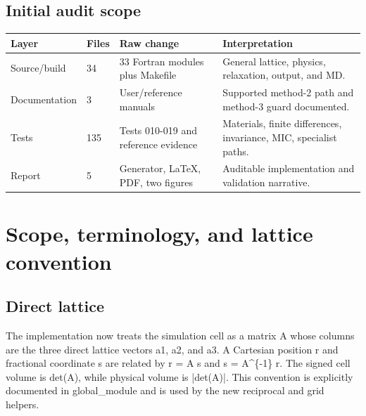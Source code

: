 \documentclass[10pt,a4paper]{report}
\begin{document}
\section{Initial audit scope}
\small\begin{longtable}{p{}|p{}|p{}|p{}}
\toprule Layer & Files & Raw change & Interpretation\\ \midrule\endhead
Source/build & 34 & 33 Fortran modules plus Makefile & General lattice, physics, relaxation, output, and MD.\\
Documentation & 3 & User/reference manuals & Supported method-2 path and method-3 guard documented.\\
Tests & 135 & Tests 010-019 and reference evidence & Materials, finite differences, invariance, MIC, specialist paths.\\
Report & 5 & Generator, LaTeX, PDF, two figures & Auditable implementation and validation narrative.\\
\bottomrule\end{longtable}\normalsize
\begin{center}\end{center}
\chapter{Scope, terminology, and lattice convention}
\section{Direct lattice}
The implementation now treats the simulation cell as a matrix A whose columns are the three direct lattice vectors a1, a2, and a3. A Cartesian position r and fractional coordinate s are related by r = A s and s = A\textasciicircum{}\{-1\} r. The signed cell volume is det(A), while physical volume is |det(A)|. This convention is explicitly documented in global\_module and is used by the new reciprocal and grid helpers.
\end{document}
